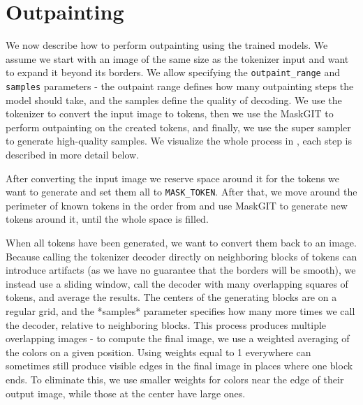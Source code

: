 \chapter{Outpainting} \label{outpainting}


We now describe how to perform outpainting using the trained models. We assume we start with an image of the same size as the tokenizer input and want to expand it beyond its borders. We allow specifying the \texttt{outpaint\_range} and \texttt{samples} parameters - the outpaint range defines how many outpainting steps the model should take, and the samples define the quality of decoding. We use the tokenizer to convert the input image to tokens, then we use the MaskGIT to perform outpainting on the created tokens, and finally, we use the super sampler to generate high-quality samples. We visualize the whole process in , each step is described in more detail below.



After converting the input image we reserve space around it for the tokens we want to generate and set them all to \texttt{MASK\_TOKEN}. After that, we move around the perimeter of known tokens in the order from  and use MaskGIT to generate new tokens around it, until the whole space is filled.



When all tokens have been generated, we want to convert them back to an image. Because calling the tokenizer decoder directly on neighboring blocks of tokens can introduce artifacts (as we have no guarantee that the borders will be smooth), we instead use a sliding window, call the decoder with many overlapping squares of tokens, and average the results. The centers of the generating blocks are on a regular grid, and the *samples* parameter specifies how many more times we call the decoder, relative to neighboring blocks. This process produces multiple overlapping images - to compute the final image, we use a weighted averaging of the colors on a given position. Using weights equal to 1 everywhere can sometimes still produce visible edges in the final image in places where one block ends. To eliminate this, we use smaller weights for colors near the edge of their output image, while those at the center have large ones.

